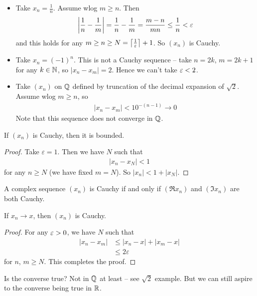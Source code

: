 \documentclass{../template/note}
\begin{document}
    \begin{example*}
        \begin{itemize}
            \item Take \(x_n = \frac{1}{n}\). Assume wlog \(m \geq n\). Then
            \begin{align*}
                \left|\frac 1 n - \frac 1 m\right| = \frac 1 n - \frac 1 m = \frac{m-n}{mn} \leq \frac{1}{n} < \varepsilon
            \end{align*}
            and this holds for any \(m \geq n \geq N = \left\lceil\frac1 {\varepsilon}\right\rceil + 1\). So \((x_n)\) is Cauchy.
            \item Take \(x_n = (-1)^n\). This is not a Cauchy sequence -- take \(n = 2k\), \(m = 2k+1\) for any \(k \in \mathbb N\), so \(|x_n - x_m| = 2\). Hence we can't take \(\varepsilon < 2\).
            \item Take \((x_n)\) on \(\mathbb Q\) defined by truncation of the decimal expansion of \(\sqrt 2\). Assume wlog \(m \geq n\), so
            \begin{align*}
                \left|x_n - x_m\right| < 10^{-(n-1)} \to 0
            \end{align*}
            Note that this sequence does not converge in \(\mathbb Q\).
        \end{itemize}
    \end{example*}
    
    \begin{lemma}
        If \((x_n)\) is Cauchy, then it is bounded.
    \end{lemma}
    
    \begin{proof}
        Take \(\varepsilon = 1\). Then we have \(N\) such that
        \begin{align*}
            |x_n - x_N| < 1
        \end{align*}
        for any \(n \geq N\) (we have fixed \(m = N\)). So \(|x_n| < 1 + |x_N|\).
    \end{proof}
    
    \begin{lemma}
        A complex sequence \((x_n)\) is Cauchy if and only if \((\Re x_n)\) and \((\Im x_n)\) are both Cauchy.
    \end{lemma}    
    
    \begin{lemma}
        If \(x_n \to x\), then \((x_n)\) is Cauchy.
    \end{lemma}
    
    \begin{proof}
        For any \(\varepsilon > 0\), we have \(N\) such that
        \begin{align*}
            |x_n - x_m| &\leq |x_n - x| + |x_m - x| \\
            &\leq 2\varepsilon
        \end{align*}
        for \(n\), \(m \geq N\). This completes the proof.        
    \end{proof}
    Is the converse true? Not in \(\mathbb Q\) at least -- see \(\sqrt 2\) example. But we can still aspire to the converse being true in \(\mathbb R\).
\end{document}
